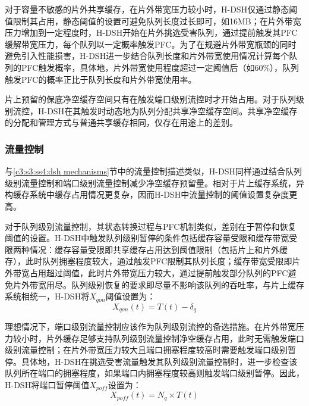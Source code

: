 
对于容量不敏感的片外共享缓存，在片外带宽压力较小时，H-DSH仅通过静态阈值限制其占用，静态阈值的设置可避免队列长度过长即可，如16MB；在片外带宽压力增加到一定程度时，H-DSH开始在片外挑选受害队列，通过提前触发其PFC缓解带宽压力，每个队列以一定概率触发PFC。为了在规避片外带宽瓶颈的同时避免引入性能损害，H-DSH进一步结合队列长度和片外带宽使用情况计算每个队列的PFC触发概率，具体地，片外带宽使用程度超过一定阈值后（如60\%），队列触发PFC的概率正比于队列长度和片外带宽使用率。

片上预留的保底净空缓存空间只有在触发端口级别流控时才开始占用。对于队列级别流控，H-DSH在其触发时动态地为队列分配共享净空缓存空间。共享净空缓存的分配和管理方式与普通共享缓存相同，仅存在用途上的差别。

\subsubsection{流量控制}

与\ref{c3:s3:ss4:dsh mechanisms}节中的流量控制描述类似，H-DSH同样通过结合队列级别流量控制和端口级别流量控制减少净空缓存预留量。相对于片上缓存系统，异构缓存系统中缓存占用情况更复杂，因而H-DSH中流量控制的阈值设置复杂度更高。

对于队列级别流量控制，其状态转换过程与PFC机制类似，差别在于暂停和恢复阈值的设置。H-DSH中触发队列级别暂停的条件包括缓存容量受限和缓存带宽受限两种情况：缓存容量受限即共享缓存占用达到阈值限制（包括片上和片外缓存），此时队列拥塞程度较大，通过触发PFC限制其队列长度；缓存带宽受限即片外带宽占用超过阈值，此时片外带宽压力较大，通过提前触发部分队列的PFC避免片外带宽用尽。队列级别恢复的要求即尽量不影响该队列的吞吐率，与片上缓存系统相统一，H-DSH将$X_{qon}$阈值设置为：
\begin{equation}
  X_{qon}(t) = T(t) - \delta_q
  \label{eqn:c4:qon threshold}
\end{equation}


理想情况下，端口级别流量控制应该作为队列级别流控的备选措施。在片外带宽压力较小时，片外缓存足够支持队列级别流量控制净空缓存占用，此时无需触发端口级别流量控制；在片外带宽压力较大且端口拥塞程度较高时需要触发端口级别暂停。具体地，H-DSH在挑选受害流量触发其队列级别流量控制时，进一步检查该队列所在端口的拥塞程度，如果端口内拥塞程度较高则触发端口级别暂停。因此，H-DSH将端口暂停阈值$X_{poff}$设置为：
\begin{equation}
  X_{poff}(t) = N_q \times T(t)
  \label{eqn:c4:poff threshold}
\end{equation}

